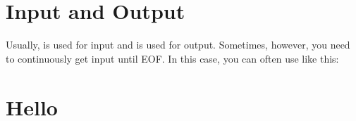 \documentclass[../main]{subfiles}
\begin{document}
\section{Input and Output}

Usually,  is used for input and  is used for output. Sometimes, however, you need to continuously get input until EOF. In this case, you can often use  like this:


\section{Hello}
\end{document}
